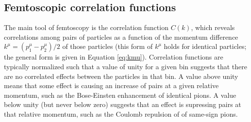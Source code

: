 \subsection{Femtoscopic correlation functions}
\label{sec:FemtoscopicCorrelationFunctions}

The main tool of femtoscopy is the correlation function $C(k)$, which reveals correlations among pairs of particles as a function of the momentum difference $k^\mu = (p_1^\mu - p_2^\mu)/2$ of those particles (this form of $k^\mu$ holds for identical particles; the general form is given in Equation \ref{eq:kmu}).
Correlation functions are typically normalized such that a value of unity for a given bin suggests that there are no correlated effects between the particles in that bin.
A value above unity means that some effect is causing an increase of pairs at a given relative momentum, such as the Bose-Einsten enhancement of identical pions. 
A value below unity (but never below zero) suggests that an effect is supressing pairs at that relative momentum, such as the Coulomb repulsion of of same-sign pions.

